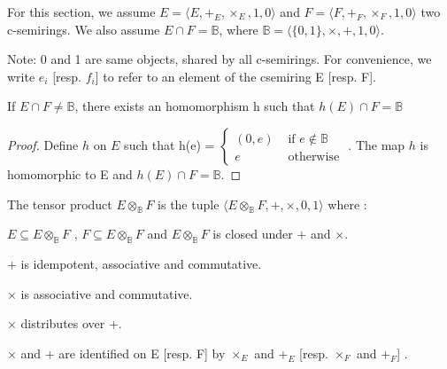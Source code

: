 For this section, we assume $E=\langle E,+_E, \times_E,1,0 \rangle$ and $F=\langle F,+_F, \times_F,1,0 \rangle$ two c-semirings. 
We also assume $E \cap F = \mathbb{B}$, where $\mathbb{B}= \langle \{0,1\}, \times,+,1,0 \rangle$.

Note: 0 and 1 are same objects, shared by all c-semirings. For convenience, we write $e_i$ [resp. $f_i$] to refer to an element of the csemiring E [resp. F].

\begin{proposition}
	If $E \cap F \not = \mathbb{B}$, there exists an homomorphism h such that  $h(E) \cap F = \mathbb{B}$
\end{proposition}
\begin{proof}
	Define $h$ on $E$ such that h(e) = $\left\{
	\begin{array}{rl}
	(0,e) & \text{ if } e \not\in \mathbb{B} \\
	e \quad & \text{ otherwise }
	\end{array}
	\right.$. The map $h$ is homomorphic to E and $h(E) \cap F = \mathbb{B}$.
	
\end{proof}

\begin{definition} The tensor product $E\otimes_{\mathbb{B}}F$ is the tuple $\langle E \otimes_{\mathbb{B}} F, +, \times, 0, 1 \rangle $ where :
	\begin{list}{-}{}
	\item $E \subseteq E \otimes_{\mathbb{B}} F$ , $F \subseteq E \otimes_{\mathbb{B}} F$ and $E \otimes_{\mathbb{B}} F$ is closed under $+$ and $\times$.
	\item + is idempotent, associative and commutative.
	\item $\times$ is associative and commutative.
	\item $\times$ distributes over +.
	\item $\times$ and + are identified on E [resp. F] by $\times_E$ and $+_E$ [resp. $\times_F$ and $+_F$] .
	\end{list}
\end{definition}

